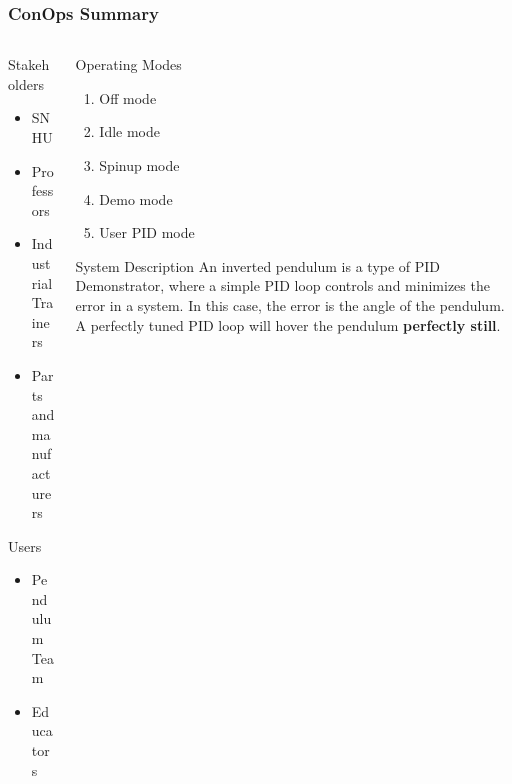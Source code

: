 \documentclass[aspectratio=169]{beamer}
\begin{document}
\begin{frame}
    \frametitle{ConOps Summary}

    \begin{columns}

    \begin{column}{0.34\textwidth}
        Stakeholders
        \begin{itemize}
         \item SNHU
         \item Professors
         \item Industrial Trainers
         \item Parts and manufacturers
        \end{itemize}

        Users
        \begin{itemize}
         \item Pendulum Team
         \item Educators
        \end{itemize}
    \end{column}

    \begin{column}{0.65\textwidth}
        \begin{block}{Operating Modes}
            \begin{enumerate}
            \item Off mode
            \item Idle mode
            \item Spinup mode
            \item Demo mode
            \item User PID mode
            \end{enumerate}
        \end{block}

        \begin{block}{System Description}
            \small{An inverted pendulum is a type of PID Demonstrator, where a simple PID loop
            controls and minimizes the error in a system. In this case, the error is the angle of the pendulum. A perfectly tuned PID loop will hover the pendulum}
            \textbf{perfectly still}.
        \end{block}
    \end{column}
\end{columns}

\end{frame}
\end{document}
